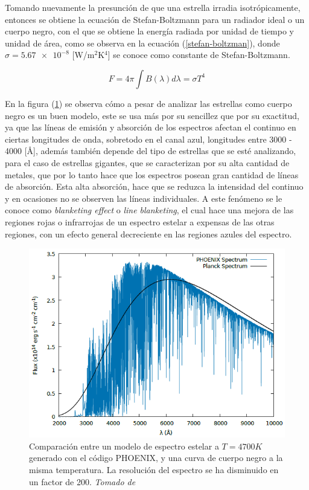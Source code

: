 \documentclass[12pt,oneside,openany,letter]{book}
\begin{document}
\noindent Tomando nuevamente la presunción de que una estrella irradia isotrópicamente, entonces se obtiene la ecuación de Stefan-Boltzmann para un radiador ideal o un cuerpo negro, con el que se obtiene la energía radiada por unidad de tiempo y unidad de área, como se observa en la ecuación (\ref{stefan-boltzman}), donde $\sigma = \num{5,67 e-8}$ [W/m$^2$K$^4$] se conoce como constante de Stefan-Boltzmann.
\vspace{2mm}

\begin{equation}
    F = 4 \pi \int B(\lambda)  d\lambda = \sigma T^4
    \label{stefan-boltzman}
\end{equation}

\noindent En la figura  (\ref{fig:lineblanketing}) se observa cómo a pesar de analizar las estrellas como cuerpo negro es un buen modelo, este se usa más por su sencillez que por su exactitud, ya que las líneas de emisión y absorción de los espectros afectan el continuo en ciertas longitudes de onda, sobretodo en el canal azul, longitudes entre 3000 - 4000 [\r{A}], además también depende del tipo de estrellas que se esté analizando, para el caso de estrellas gigantes, que se caracterizan por su alta cantidad de metales, que por lo tanto hace que los espectros posean gran cantidad de líneas de absorción. Esta alta absorción, hace que se reduzca la intensidad del continuo y en ocasiones no se observen las líneas individuales. A este fenómeno se le conoce como \textit{blanketing effect} o \textit{line blanketing}, el cual hace una mejora de las regiones rojas o infrarrojas de un espectro estelar a expensas de las otras regiones, con un efecto general decreciente en las regiones azules del espectro.


\begin{figure}[h]
    \centering
    \includegraphics[width=0.9\linewidth]{Images/lineblanck.PNG}
    \caption{Comparación entre un modelo de espectro estelar a $T = 4700 K$ generado con el código PHOENIX, y una curva de cuerpo negro a la misma temperatura. La resolución del espectro se ha disminuido en un factor de 200. \textit{Tomado de \citep{Faiber2019master}}}
    \label{fig:lineblanketing}
\end{figure}
\end{document}
